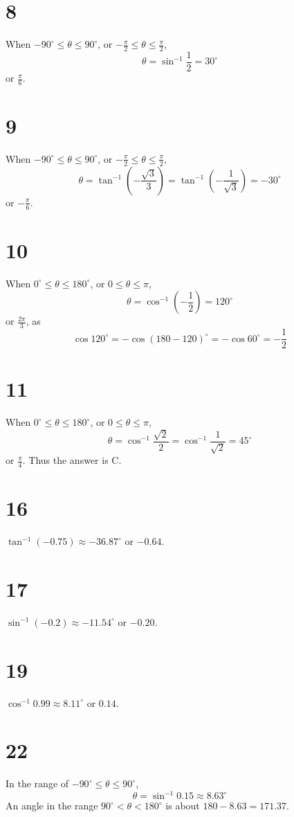 \documentclass{article}
\theoremstyle{definition}
\newcommand{\?}{\stackrel{?}{=}}
\begin{document}
\section*{8}
When $-90^\circ\le\theta\le 90^\circ$, or $-\frac{\pi}{2}\le\theta\le\frac{\pi}{2}$,
\[ \theta=\sin^{-1}\frac{1}{2}=30^\circ \] or $\frac{\pi}{6}$.

\section*{9}
When $-90^\circ\le\theta\le 90^\circ$, or $-\frac{\pi}{2}\le\theta\le\frac{\pi}{2}$,
\[ \theta=\tan^{-1}\left(-\frac{\sqrt{3}}{3}\right)=\tan^{-1}\left(-\frac{1}{\sqrt{3}}\right)=-30^\circ \] or
$-\frac{\pi}{6}$.

\section*{10}
When $0^\circ\le\theta\le 180^\circ$, or $0\le\theta\le\pi$,
\[ \theta=\cos^{-1}(-\frac{1}{2})=120^\circ \] or $\frac{2\pi}{3}$, as
\[ \cos 120^\circ=-\cos (180-120)^\circ=-\cos 60^\circ=-\frac{1}{2} \]

\section*{11}
When $0^\circ\le\theta\le 180^\circ$, or $0\le\theta\le\pi$,
\[ \theta=\cos^{-1}\frac{\sqrt{2}}{2}=\cos^{-1}\frac{1}{\sqrt{2}}=45^\circ \] or $\frac{\pi}{4}$. Thus the answer is C.

\section*{16}
$\tan^{-1}(-0.75)\approx -36.87^\circ$ or $-0.64$.

\section*{17}
$\sin^{-1}(-0.2)\approx -11.54^\circ$ or $-0.20$.

\section*{19}
$\cos^{-1}0.99\approx 8.11^\circ$ or $0.14$.

\section*{22}
In the range of $-90^\circ\le\theta\le 90^\circ$,
\[ \theta=\sin^{-1} 0.15\approx 8.63^\circ \] An angle in the range $90^\circ <\theta<180^\circ$ is about
$180-8.63=171.37$.
\end{document}
